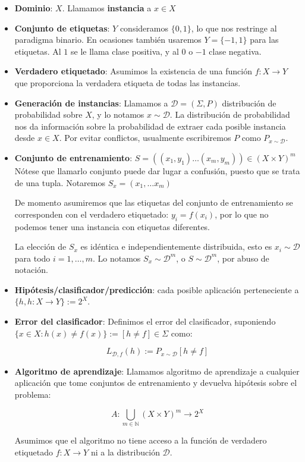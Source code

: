 \begin{itemize}
\item \textbf{Dominio}: $X$. Llamamos \textbf{instancia} a $x\in X$

\item \textbf{Conjunto de etiquetas}: $Y$ consideramos $\{0,1\}$, lo que nos restringe al paradigma binario. En ocasiones 
también usaremos $Y = \{-1,1\}$ para las etiquetas. Al $1$ se le llama clase positiva, y al $0$ o $-1$ clase negativa.

\item \textbf{Verdadero etiquetado}: \sloppy Asumimos la existencia de una función ${f: X \rightarrow Y}$ 
que proporciona la verdadera etiqueta de todas las instancias.

\item \textbf{Generación de instancias}: \fussy Llamamos a $\mathcal{D} = (\Sigma, P)$ distribución de probabilidad sobre $X$,
y lo notamos $x\sim \mathcal{D}$. La distribución de probabilidad nos da información sobre la probabilidad de extraer cada 
posible instancia desde  $x \in X$. Por evitar conflictos, usualmente escribiremos $P$ como $P_{x\sim \mathcal{D}}$.

\item \textbf{Conjunto de entrenamiento}: $S = ((x_1,y_1) \ldots (x_m,y_m)) \in (X \times Y)^m$ 
Nótese que llamarlo conjunto puede dar lugar a confusión, puesto que se trata de una tupla. Notaremos 
$S_x = (x_1, \ldots x_m)$

De momento asumiremos que las etiquetas del conjunto de entrenamiento se corresponden con el verdadero etiquetado: 
$y_i = f(x_i)$, por lo que no podemos tener una instancia con etiquetas diferentes.

La elección de $S_x$ es idéntica e independientemente distribuida, esto es $x_i \sim \mathcal{D}$ para todo $i=1, \ldots, m$.
Lo notamos $S_x \sim \mathcal{D}^m$, o $S \sim \mathcal{D}^m$, por abuso de notación.

\item \textbf{Hipótesis/clasificador/predicción}: cada posible aplicación perteneciente a 
$\{h, h:X \rightarrow Y\} := 2^{X}$. 

\item \textbf{Error del clasificador}: Definimos el error del clasificador, suponiendo 
$\{x\in X : h(x) \neq f(x)\} := [h\neq f] \in \Sigma$ como:

\[L_{\mathcal{D},f}(h) :=  P_{x\sim \mathcal{D}} [h \neq f]\]

\item \textbf{Algoritmo de aprendizaje}: Llamamos algoritmo de aprendizaje a cualquier aplicación que tome conjuntos de 
entrenamiento y devuelva hipótesis sobre el problema:

\[A: \underset{m\in \mathbb{N}}{\bigcup} (X\times Y)^m \rightarrow 2^{X}\]

Asumimos que el algoritmo no tiene acceso a la función de verdadero etiquetado $f: X \rightarrow Y$ ni a
la distribución $\mathcal{D}$.
\end{itemize}

